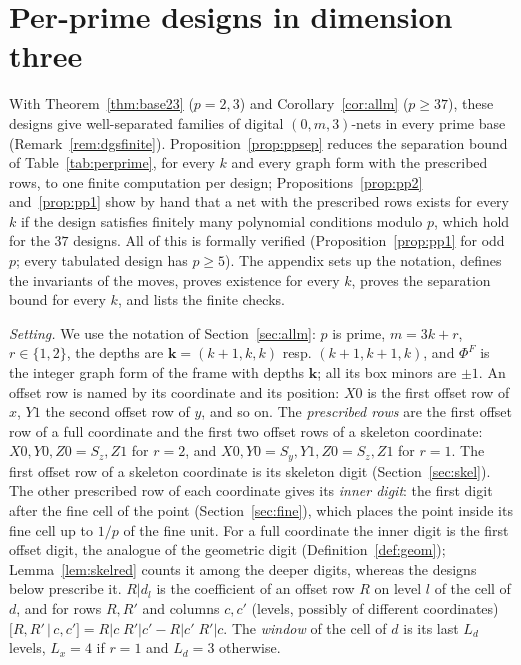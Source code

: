 \documentclass[11pt]{amsart}
\theoremstyle{definition}
\theoremstyle{plain}
\begin{document}
\section{Per-prime designs in dimension three}\label{app:perprime}
\begingroup\small
With Theorem~\ref{thm:base23} ($p=2,3$) and Corollary~\ref{cor:allm} ($p\ge37$), these designs give well-separated families of digital $(0,m,3)$-nets in every prime base (Remark~\ref{rem:dgsfinite}). Proposition~\ref{prop:ppsep} reduces the separation bound of Table~\ref{tab:perprime}, for every $k$ and every graph form with the prescribed rows, to one finite computation per design; Propositions~\ref{prop:pp2} and~\ref{prop:pp1} show by hand that a net with the prescribed rows exists for every $k$ if the design satisfies finitely many polynomial conditions modulo $p$, which hold for the $37$ designs. All of this is formally verified (Proposition~\ref{prop:pp1} for odd $p$; every tabulated design has $p\ge5$). The appendix sets up the notation, defines the invariants of the moves, proves existence for every $k$, proves the separation bound for every $k$, and lists the finite checks.

\emph{Setting.} We use the notation of Section~\ref{sec:allm}: $p$ is prime, $m=3k+r$, $r\in\{1,2\}$, the depths are $\mathbf k=(k+1,k,k)$ resp. $(k+1,k+1,k)$, and $\Phi^F$ is the integer graph form of the frame with depths $\mathbf k$; all its box minors are $\pm1$. An offset row is named by its coordinate and its position: $X0$ is the first offset row of $x$, $Y1$ the second offset row of $y$, and so on. The \emph{prescribed rows} are the first offset row of a full coordinate and the first two offset rows of a skeleton coordinate: $X0,Y0,Z0=S_z,Z1$ for $r=2$, and $X0,Y0=S_y,Y1,Z0=S_z,Z1$ for $r=1$. The first offset row of a skeleton coordinate is its skeleton digit (Section~\ref{sec:skel}). The other prescribed row of each coordinate gives its \emph{inner digit}: the first digit after the fine cell of the point (Section~\ref{sec:fine}), which places the point inside its fine cell up to $1/p$ of the fine unit. For a full coordinate the inner digit is the first offset digit, the analogue of the geometric digit (Definition~\ref{def:geom}); Lemma~\ref{lem:skelred} counts it among the deeper digits, whereas the designs below prescribe it. $R|d_l$ is the coefficient of an offset row $R$ on level $l$ of the cell of $d$, and for rows $R,R'$ and columns $c,c'$ (levels, possibly of different coordinates) $[R,R'\,|\allowbreak\,c,c']=R|c\;R'|c'-R|c'\;R'|c$. The \emph{window} of the cell of $d$ is its last $L_d$ levels, $L_x=4$ if $r=1$ and $L_d=3$ otherwise.
\end{document}
